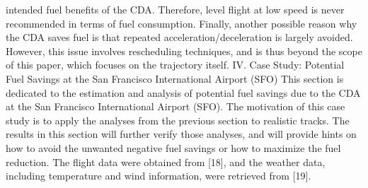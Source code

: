 \documentclass{aer1315-pretty}
\begin{document}
\begin{itemize}
intended fuel benefits of the CDA. Therefore, level flight at low speed
is never recommended in terms of fuel consumption.
   Finally, another possible reason why the CDA saves fuel is that
repeated acceleration/deceleration is largely avoided. However, this
issue involves rescheduling techniques, and is thus beyond the scope
of this paper, which focuses on the trajectory itself.
    IV.    Case Study: Potential Fuel Savings at the San
            Francisco International Airport (SFO)
   This section is dedicated to the estimation and analysis of potential
fuel savings due to the CDA at the San Francisco International
Airport (SFO). The motivation of this case study is to apply the
analyses from the previous section to realistic tracks. The results in
this section will further verify those analyses, and will provide hints
on how to avoid the unwanted negative fuel savings or how to
maximize the fuel reduction. The flight data were obtained from [18],
and the weather data, including temperature and wind information,
were retrieved from [19].


\end{itemize}
\end{document}
